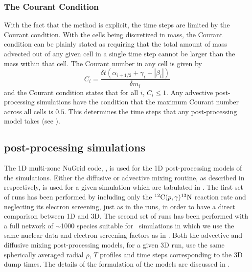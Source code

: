 \documentclass[fleqn,usenatbib]{mnras}
\newcommand{\ppmstar}{\code{PPMstar}}
\begin{document}
\subsubsection{The Courant Condition}
\label{sec:courant}

With the fact that the method is explicit, the time steps are limited by the
Courant condition. With the cells being discretized in mass, the Courant
condition can be plainly stated as requiring that the total amount of mass
advected out of any given cell in a single time step cannot be larger than the
mass within that cell. The Courant number in any cell is given by
%
\begin{equation}
  \label{eq:courant}
  C_{i} = \frac{\delta t \left(\alpha_{i+1/2} + \gamma_{i} + |\beta_{i}| \right)}{\delta m_{i}}
\end{equation}
%
and the Courant condition states that for all $i$, $C_{i} \leq 1$. Any advective
post-processing simulations have the condition that the maximum Courant number
across all cells is $0.5$. This determines the time steps that any
post-processing model takes (see ).

\subsection{\mppnp{} post-processing simulations}
\label{sec:mppnpSims}

The 1D multi-zone NuGrid code, \mppnp{}
\citep{Pignatari:2016er,RitterSE}, is used for the 1D post-processing
models of the \ppmstar{} simulations. Either the diffusive or
advective mixing routine, as described in
 respectively, is used for a given
\mppnp{} simulation which are tabulated in . The first
set of runs has been performed by including only the
$\mathrm{^{12}C}(p,\gamma)\mathrm{^{13}N}$ reaction rate and
neglecting its electron screening, just as in the \ppmstar{} runs, in
order to have a direct comparison between 1D and 3D. The second set of
runs has been performed with a full network of $\sim$1000 species
suitable for \ipr\ simulations in which we use the same nuclear data
and electron screening factors as in \citet{Denissenkov:19}. Both the
advective and diffusive mixing post-processing models, for a given 3D
\ppmstar{} run, use the same spherically averaged radial $\rho$, $T$
profiles and time steps corresponding to the 3D dump times. The
details of the formulation of the models are discussed
in .
\end{document}
